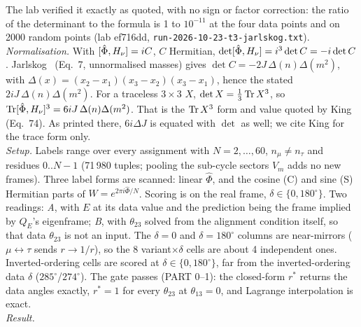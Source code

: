 \noindent The lab verified it exactly as quoted, with no sign or factor correction: the ratio of
the determinant to the formula is 1 to $10^{-11}$ at the four data points and on 2000 random points
(lab ef716dd, \texttt{run-2026-10-23-t3-jarlskog.txt}).\\
\emph{Normalisation.} With $[\hat\Phi,H_\nu]=iC$, $C$ Hermitian,
$\det[\hat\Phi,H_\nu]=i^3\det C=-i\det C$. Jarlskog~\cite{jarlskog1985} (Eq.~7, unnormalised masses)
gives $\det C=-2J\,\Delta(n)\Delta(m^2)$, with $\Delta(x)=(x_2-x_1)(x_3-x_2)(x_3-x_1)$, hence the
stated $2iJ\,\Delta(n)\Delta(m^2)$. For a traceless $3\times3$ $X$, $\det X=\tfrac13\operatorname{Tr} X^3$, so
$\operatorname{Tr}[\hat\Phi,H_\nu]^3=6iJ\,\Delta(n)\Delta(m^2)$. That is the $\operatorname{Tr} X^3$ form and value quoted by
King~\cite{king2017} (Eq.~74). As printed there, $6i\Delta J$ is equated with $\det$ as well; we
cite King for the trace form only.\\
\emph{Setup.} Labels range over every assignment with $N=2,\dots,60$, $n_\mu\neq n_\tau$ and
residues $0..N-1$ (71\,980 tuples; pooling the sub-cycle sectors $V_m$ adds no new frames). Three
label forms are scanned: linear $\hat\Phi$, and the cosine (C) and sine (S) Hermitian parts of
$W=e^{2\pi i\hat\Phi/N}$. Scoring is on the real frame, $\delta\in\{0,180^\circ\}$. Two readings:
\emph{A}, with $E$ at its data value and the prediction being the frame implied by $Q_E$'s
eigenframe; \emph{B}, with $\theta_{23}$ solved from the alignment condition itself, so that data
$\theta_{23}$ is not an input. The $\delta=0$ and $\delta=180^\circ$ columns are near-mirrors
($\mu\leftrightarrow\tau$ sends $r\to1/r$), so the 8 variant$\times\delta$ cells are about 4
independent ones. Inverted-ordering cells are scored at $\delta\in\{0,180^\circ\}$, far from the
inverted-ordering data $\delta$ ($285^\circ$/$274^\circ$). The gate passes (PART 0--1): the closed-form $r^*$ returns the data
angles exactly, $r^*=1$ for every $\theta_{23}$ at $\theta_{13}=0$, and Lagrange interpolation is
exact.\\
\emph{Result.}
